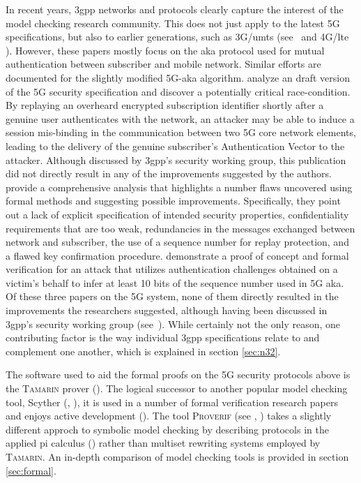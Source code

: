 In recent years, \gls{3gpp} networks and protocols clearly capture the interest of the model checking research community.
This does not just apply to the latest 5G specifications, but also to earlier generations, such as 3G/\gls{umts} (see~\cite{alt2016cryptographic} and 4G/\gls{lte} \cite{lee2014anonymity}).
However, these papers mostly focus on the \gls{aka} protocol used for mutual authentication between subscriber and mobile network.
Similar efforts are documented for the slightly modified 5G-\gls{aka} algorithm.
\cite{dehnel2018security} analyze an draft version of the 5G security specification and discover a potentially critical race-condition.
By replaying an overheard encrypted subscription identifier shortly after a genuine user authenticates with the network, an attacker may be able to induce a session mis-binding in the communication between two 5G core network elements, leading to the delivery of the genuine subscriber's Authentication Vector to the attacker.
Although discussed by \gls{3gpp}'s security working group, this publication did not directly result in any of the improvements suggested by the authors.
\cite{basin2018formal} provide a comprehensive analysis that highlights a number flaws uncovered using formal methods and suggesting possible improvements.
Specifically, they point out a lack of explicit specification of intended security properties, confidentiality requirements that are too weak, redundancies in the messages exchanged between network and subscriber, the use of a sequence number for replay protection, and a flawed key confirmation procedure.
\cite{borgaonkar2019new} demonstrate a proof of concept and formal verification for an attack that utilizes authentication challenges obtained on a victim's behalf to infer at least 10 bits of the sequence number used in 5G \gls{aka}.
Of these three papers on the 5G system, none of them directly resulted in the improvements the researchers suggested, although having been discussed in \gls{3gpp}'s security working group (see~\cite{s3-180727}).
While certainly not the only reason, one contributing factor is the way individual \gls{3gpp} specifications relate to and complement one another, which is explained in section \ref{sec:n32}.

The software used to aid the formal proofs on the 5G security protocols above is the \textsc{Tamarin} prover (\cite{meier2013tamarin}).
The logical successor to another popular model checking tool, Scyther (\cite{cremers2008scyther}, \cite{scyther}), it is used in a number of formal verification research papers and enjoys active development (\cite{tamarin}).
The tool \textsc{Proverif} (see \cite{blanchet2016modeling}, \cite{proverif}) takes a slightly different approch to symbolic model checking by describing protocols in the applied pi calculus (\cite{ryan2011applied}) rather than multiset rewriting systems employed by \textsc{Tamarin}.
An in-depth comparison of model checking tools is provided in section \ref{sec:formal}.

